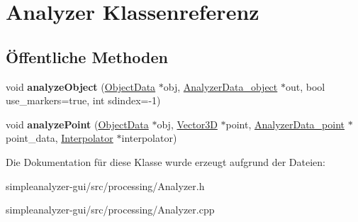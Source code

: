 \hypertarget{classAnalyzer}{\section{Analyzer Klassenreferenz}
\label{classAnalyzer}
}
\subsection*{Öffentliche Methoden}
\begin{DoxyCompactItemize}
\item 
\hypertarget{classAnalyzer_a2a7b5f169f664ccd9f206e508cba78ef}{void {\bfseries analyze\-Object} (\hyperlink{classObjectData}{Object\-Data} $\ast$obj, \hyperlink{structAnalyzerData__object}{Analyzer\-Data\-\_\-object} $\ast$out, bool use\-\_\-markers=true, int sdindex=-\/1)}\label{classAnalyzer_a2a7b5f169f664ccd9f206e508cba78ef}

\item 
\hypertarget{classAnalyzer_a8f73ee0aa71ae395a74b43dc76b35458}{void {\bfseries analyze\-Point} (\hyperlink{classObjectData}{Object\-Data} $\ast$obj, \hyperlink{classVector3D}{Vector3\-D} $\ast$point, \hyperlink{structAnalyzerData__point}{Analyzer\-Data\-\_\-point} $\ast$point\-\_\-data, \hyperlink{classInterpolator}{Interpolator} $\ast$interpolator)}\label{classAnalyzer_a8f73ee0aa71ae395a74b43dc76b35458}

\end{DoxyCompactItemize}


Die Dokumentation für diese Klasse wurde erzeugt aufgrund der Dateien\-:\begin{DoxyCompactItemize}
\item 
simpleanalyzer-\/gui/src/processing/Analyzer.\-h\item 
simpleanalyzer-\/gui/src/processing/Analyzer.\-cpp\end{DoxyCompactItemize}
